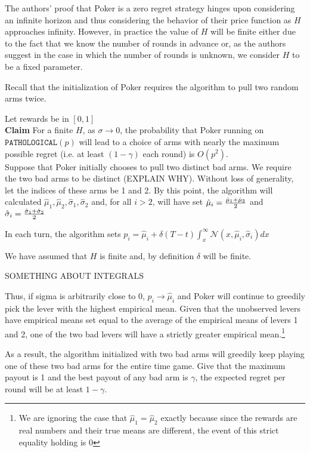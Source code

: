 \documentclass[12pt]{article}
\begin{document}
The authors' proof that Poker is a zero regret strategy hinges upon considering an infinite horizon and thus considering the behavior of their price function as $H$ approaches infinity. However, in practice the value of $H$ will be finite either due to the fact that we know the number of rounds in advance or, as the authors suggest in the case in which the number of rounds is unknown, we consider $H$ to be a fixed parameter.

Recall that the initialization of Poker requires the algorithm to pull two random arms twice.


Let rewards be in $[0,1]$ \\

\noindent
\textbf{Claim} For a finite $H$, as $\sigma \rightarrow 0$, the probability that Poker running on $\texttt{PATHOLOGICAL}(p)$ will lead to a choice of arms with nearly the maximum possible regret (i.e. at least $(1-\gamma)$ each round) is $O(p^{2})$. \\ 

Suppose that Poker initially chooses to pull two distinct bad arms. We require the two bad arms to be distinct (EXPLAIN WHY). Without loss of generality, let the indices of these arms be 1 and 2. By this point, the algorithm will calculated $\hat{\mu}_{1}, \hat{\mu}_{2}, \hat{\sigma}_{1},\hat{\sigma}_{2}$ and, for all $i > 2$, will have set $\hat{\mu}_{i}= {\hat{\mu}_{1}+\hat{\mu}_{2}\over 2}$ and $\hat{\sigma}_{i} = {\hat{\sigma}_{1}+\hat{\sigma}_{2}\over 2}$

In each turn, the algorithm sets $p_{i} = \hat{\mu}_{i} + \delta(T-t)\int_{x}^{\infty}\mathcal{N}(x,\hat{\mu}_{i}, \hat{\sigma}_{i})dx$



We have assumed that $H$ is finite and, by definition $\delta$ will be finite.

SOMETHING ABOUT INTEGRALS

Thus, if sigma is arbitrarily close to $0$, $p_{i} \rightarrow \hat{\mu}_{i}$ and Poker will continue to greedily pick the lever with the highest empirical mean. Given that the unobserved levers have empirical means set equal to the average of the empirical means of levers 1 and 2, one of the two bad levers will have a strictly greater empirical mean.\footnote{We are ignoring the case that $\hat{\mu}_{1} = \hat{\mu}_{2}$ exactly because since the rewards are real numbers and their true means are different, the event of this strict equality holding is 0}

As a result, the algorithm initialized with two bad arms will greedily keep playing one of these two bad arms for the entire time game. Give that the maximum payout is 1 and the best payout of any bad arm is $\gamma$, the expected regret per round will be at least $1-\gamma$. 
\end{document}

